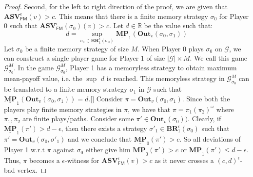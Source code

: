 \begin{proof}
	Second, for the left to right direction of the proof, we are given that $\mathbf{ASV}_{\mathsf{FM}}^{\epsilon}(v) > c$. This means that there is a finite memory strategy $\sigma_0$ for Player 0 such that $\mathbf{ASV}_{\mathsf{FM}}^{\epsilon}(\sigma_0)(v) > c$. Let $d \in \mathbb{R}$ be the value such that:
	\begin{equation*}
	    d = \sup\limits_{\sigma_1 \in \mathbf{BR}_1^{\epsilon}(\sigma_0)} \underline{\mathbf{MP}}_1(\mathbf{Out}_v(\sigma_0, \sigma_1))
	\end{equation*}
	Let $\sigma_0$ be a finite memory strategy of size $M$. When Player 0 plays $\sigma_0$ on $\mathcal{G}$, we can construct a single player game for Player 1 of size $|\mathcal{G}|\times M$. We call this game $\mathcal{G}^M_{\sigma_0}$. In the game $\mathcal{G}^M_{\sigma_0}$, Player 1 has a memoryless strategy to obtain maximum mean-payoff value, i.e. the $\sup$ $d$ is reached. This memoryless strategy in $\mathcal{G}^M_{\sigma_0}$ can be translated to a finite memory strategy $\sigma_1$ in $\mathcal{G}$ such that $\underline{\mathbf{MP}}_1(\mathbf{Out}_v(\sigma_0, \sigma_1)) = d$.[]
	Consider $\pi = \mathbf{Out}_v(\sigma_0, \sigma_1)$. Since both the players play finite memory strategies in $\pi$, we have that $\pi = \pi_1(\pi_2)^{\omega}$ where $\pi_1, \pi_2$ are finite plays/paths. Consider some $\pi' \in \mathbf{Out}_v(\sigma_0))$. Clearly, if $\underline{\mathbf{MP}}_1(\pi') > d-\epsilon$, then there exists a strategy $\sigma'_1 \in \mathbf{BR}_1^{\epsilon}(\sigma_0)$ such that $\pi' = \mathbf{Out}_v(\sigma_0, \sigma'_1)$ and we conclude that $\underline{\mathbf{MP}}_0(\pi') > c$. So all deviations of Player 1 w.r.t $\pi$ against $\sigma_0$ either give him $\underline{\mathbf{MP}}_0(\pi') > c$ or $\underline{\mathbf{MP}}_1(\pi') \leqslant d-\epsilon$. Thus, $\pi$ becomes a $\epsilon$-witness for $\mathbf{ASV}_{\mathsf{FM}}^{\epsilon}(v) > c$ as it never crosses a $(c,d)^{\epsilon}$-bad vertex.
\end{proof}